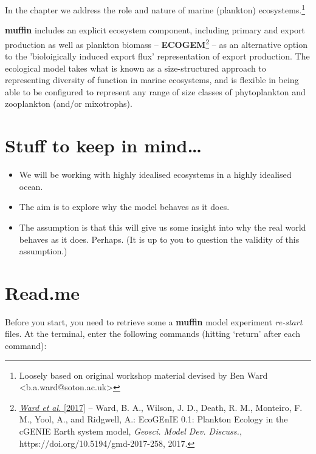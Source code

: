 \documentclass[11pt,fleqn]{book} %
\begin{document}
\hfill \break

\noindent In the chapter we address the role and nature of marine (plankton) ecosystems.\footnote{Loosely based on original workshop material  devised by Ben Ward <b.a.ward@soton.ac.uk>}

\textbf{muffin} includes an explicit ecosystem component, including primary and export production as well as plankton biomass -- \textbf{ECOGEM}\footnote{\href{https://doi.org/10.5194/gmd-2017-258}{\textit{Ward et al.} [2017]} -- Ward, B. A., Wilson, J. D., Death, R. M., Monteiro, F. M., Yool, A., and Ridgwell, A.: EcoGEnIE 0.1: Plankton Ecology in the cGENIE Earth system model, \textit{Geosci. Model Dev. Discuss.}, https://doi.org/10.5194/gmd-2017-258, 2017.} -- as an alternative option to the 'bioloigically induced export flux' representation of export production. The ecological model takes what is known as a size-structured approach to representing diversity of function in marine ecosystems, and is flexible in being able to be configured to represent any range of size classes of phytoplankton and zooplankton (and/or mixotrophs).

\section*{Stuff to keep in mind\dots}
\begin{itemize}
\item We will be working with highly idealised ecosystems in a highly idealised ocean.
\item The aim is to explore why the model behaves as it does.
\item The assumption is that this will give us some insight into why the real world behaves as it does. Perhaps. (It is up to you to question the validity of this assumption.)
\end{itemize}


\newpage


\section*{Read.me}

Before you start, you need to retrieve some a \textbf{muffin} model experiment \textit{re-start} files. At the terminal, enter the  following commands (hitting `return' after each command):
\end{document}
